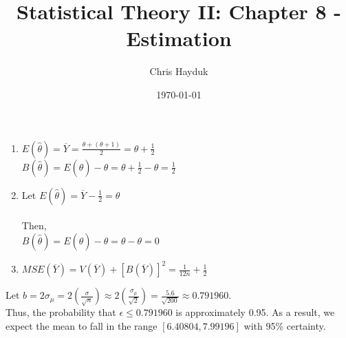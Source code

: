 \documentclass[12pt]{article}
\newenvironment{problem}[2][Problem]{\begin{trivlist}
\item[\hskip \labelsep {\bfseries #1}\hskip \labelsep {\bfseries #2.}]}{\end{trivlist}}
\begin{document}
\title{Statistical Theory II: Chapter 8 - Estimation}

\author{Chris Hayduk}
\date{\today}

\maketitle

\begin{problem}{8.12}
\end{problem}

\begin{enumerate}[label=\alph*)]
	\item $E(\hat{\theta}) = \overline{Y} = \frac{\theta + (\theta+1)}{2} = \theta + \frac{1}{2}$\\
		  $B(\hat{\theta}) = E(\hat{\theta}) - \theta = \theta + \frac{1}{2} - \theta = \frac{1}{2}$
	\item Let $E(\hat{\theta}) = \overline{Y} - \frac{1}{2} = \theta$\\
		  \\
		  Then,\\
		  $B(\hat{\theta}) = E(\hat{\theta}) - \theta = \theta - \theta = 0$
	\item $MSE(\overline{Y}) = V(\overline{Y}) + [B(\overline{Y})]^2 = \frac{1}{12n} + \frac{1}{2}$
\end{enumerate}

\begin{problem}{8.22}
\end{problem}

Let $b = 2\sigma_{\mu} = 2(\frac{\sigma}{\sqrt{n}}) \approx 2(\frac{\sigma_{\mu}}{\sqrt{2}}) = \frac{5.6}{\sqrt{200}} \approx 0.791960.$\\

Thus, the probability that $\epsilon \leq 0.791960$ is approximately 0.95. As a result, we expect the mean to fall in the range $[6.40804, 7.99196]$ with 95\% certainty.

\begin{problem}{8.46}
\end{problem}
\end{document}

